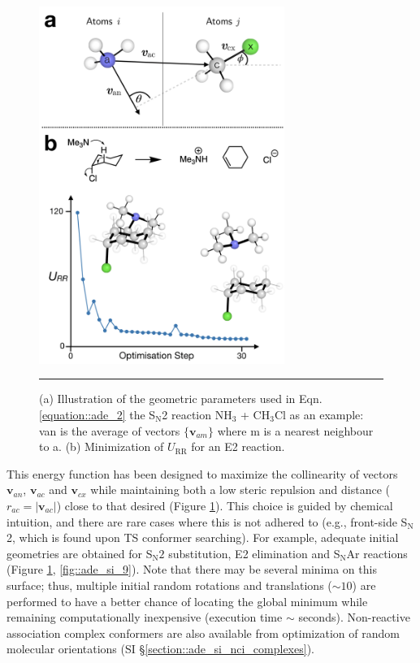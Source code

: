 \documentclass[../../main.tex]{subfiles}
\begin{document}
\begin{figure}[h!]
	\vspace{0.4cm}
	\centering
	\includegraphics[width=8cm]{5/autode/figs/fig4}
	\vspace{0.3cm}
	\hrule
	\caption{(a) Illustration of the geometric parameters used in Eqn. \eqref{equation::ade_2} the S$_\text{N}$2 reaction NH$_3$ + CH$_3$Cl as an example: van is the average of vectors $\{\boldsymbol{v}_{am}\}$ where m is a nearest neighbour to a. (b) Minimization of $U_\text{RR}$  for an E2 reaction.}
	\label{fig::ade_4}
\end{figure}

This energy function has been designed to maximize the collinearity of vectors $\boldsymbol{v}_{an}$, $\boldsymbol{v}_{ac}$ and $\boldsymbol{v}_{cx}$ while maintaining both a low steric repulsion and distance ($r_{ac} = |\boldsymbol{v}_{ac}|$) close to that desired (Figure \ref{fig::ade_4}). This choice is guided by chemical intuition, and there are rare cases where this is not adhered to (e.g., front-side S$_\text{N}$2,\cite{Hamlin2018} which is found upon TS conformer searching). For example, adequate initial geometries are obtained for S${}_\text{N}2$ substitution, E2 elimination and S$_\text{N}$Ar reactions (Figure \ref{fig::ade_4}, \ref{fig::ade_si_9}). Note that there may be several minima on this surface; thus, multiple initial random rotations and translations ($\sim 10$) are performed to have a better chance of locating the global minimum while remaining computationally inexpensive (execution time $\sim$ seconds). Non-reactive association complex conformers are also available from optimization of random molecular orientations (SI §\ref{section::ade_si_nci_complexes}).
\end{document}
